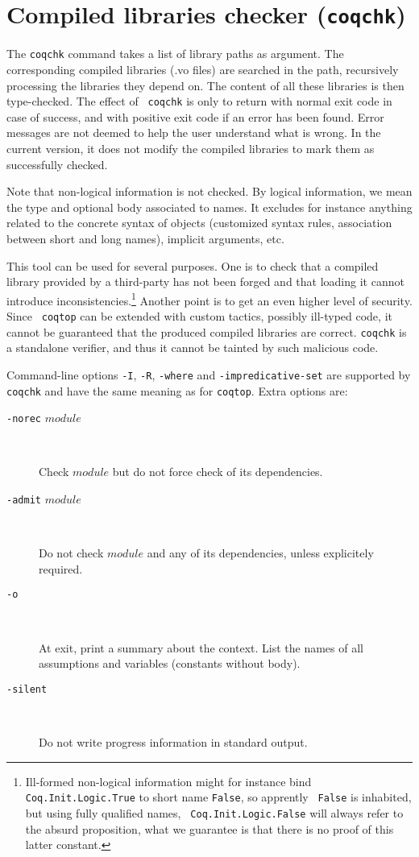 \section{Compiled libraries checker ({\tt coqchk})}

The {\tt coqchk} command takes a list of library paths as argument.
The corresponding compiled libraries (.vo files) are searched in the
path, recursively processing the libraries they depend on. The content
of all these libraries is then type-checked. The effect of {\tt
  coqchk} is only to return with normal exit code in case of success,
and with positive exit code if an error has been found. Error messages
are not deemed to help the user understand what is wrong. In the
current version, it does not modify the compiled libraries to mark
them as successfully checked.

Note that non-logical information is not checked. By logical
information, we mean the type and optional body associated to names.
It excludes for instance anything related to the concrete syntax of
objects (customized syntax rules, association between short and long
names), implicit arguments, etc.

This tool can be used for several purposes. One is to check that a
compiled library provided by a third-party has not been forged and
that loading it cannot introduce inconsistencies.\footnote{Ill-formed
  non-logical information might for instance bind {\tt
    Coq.Init.Logic.True} to short name {\tt False}, so apprently {\tt
    False} is inhabited, but using fully qualified names, {\tt
    Coq.Init.Logic.False} will always refer to the absurd proposition,
  what we guarantee is that there is no proof of this latter
  constant.}
Another point is to get an even higher level of security. Since {\tt
  coqtop} can be extended with custom tactics, possibly ill-typed
code, it cannot be guaranteed that the produced compiled libraries are
correct. {\tt coqchk} is a standalone verifier, and thus it cannot be
tainted by such malicious code.

Command-line options {\tt -I}, {\tt -R}, {\tt -where} and
{\tt -impredicative-set} are supported by {\tt coqchk} and have the
same meaning as for {\tt coqtop}. Extra options are:
\begin{description}
\item[{\tt -norec} $module$]\ 

  Check $module$ but do not force check of its dependencies.
\item[{\tt -admit} $module$] \

  Do not check $module$ and any of its dependencies, unless
  explicitely required.
\item[{\tt -o}]\ 

  At exit, print a summary about the context. List the names of all
  assumptions and variables (constants without body).
\item[{\tt -silent}]\ 

  Do not write progress information in standard output.
\end{description}

